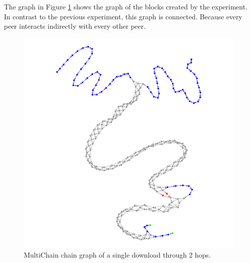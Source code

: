 The graph in Figure \ref{fig:synthetic-anonymous-graph} shows the graph of the blocks created by the experiment.
In contrast to the previous experiment, this graph is connected.
Because every peer interacts indirectly with every other peer.

\begin{figure}
	\centerline{\includegraphics[scale=0.1]{experimentation/anonymous/anonymous.png}}
	\caption{MultiChain chain graph of a single download through 2 hops.}
	\label{fig:synthetic-anonymous-graph}
\end{figure}


